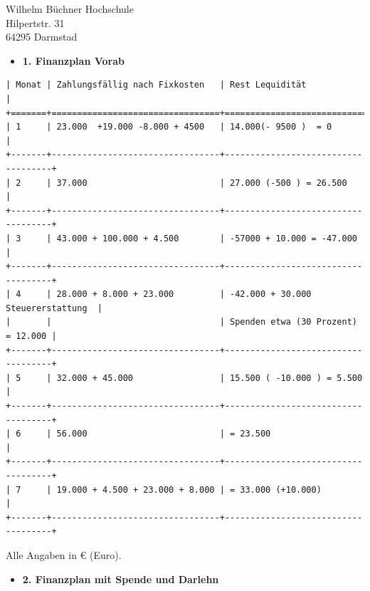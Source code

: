 \documentclass[
    version=last,           %
    DIV=13,                 %
    BCOR=0mm,               %
    paper=a4,               %
    fontsize=12pt,          %
    firsthead=on,           %
    firstfoot=on,           %
    pagenumber=on,i         %
    parskip=half,           %
    enlargefirstpage=,      %
    firsthead=on,           %
    fromrule=afteraddress,  %
    priority=off,           %
    backaddress=true,       %
    refline=dateright,      %
	fromalign=right,	    %
    fromemail=on,i          %
    fromurl=on,             %
    frombank=on,
    fromphone=on,           %
    frommobilephone=on      %
    fromlogo=on,            %
    addrfield=on,           %
    subject=untitled,  %
    foldmarks=off,          %
    numericaldate=off,      %
	pagenumber=right,	        %
	parskip=half,	        %
    headsep=false,          %
    footsepline=true,       %
    foldmarks=off,		    %
	]{scrlttr2}
\begin{document}
\begin{letter} {Wilhelm Büchner Hochschule \\
Hilpertstr. 31\\
64295 Darmstad}
\begin{itemize}
\item  \textbf{1. Finanzplan Vorab}
\end{itemize}

        \begin{verbatim}
| Monat | Zahlungsfällig nach Fixkosten   | Rest Lequidität                    |
+=======+=================================+====================================+
| 1     | 23.000  +19.000 -8.000 + 4500   | 14.000(- 9500 )  = 0               |
+-------+---------------------------------+------------------------------------+
| 2     | 37.000                          | 27.000 (-500 ) = 26.500            |
+-------+---------------------------------+------------------------------------+
| 3     | 43.000 + 100.000 + 4.500        | -57000 + 10.000 = -47.000          |
+-------+---------------------------------+------------------------------------+
| 4     | 28.000 + 8.000 + 23.000         | -42.000 + 30.000 Steuererstattung  |
|       |                                 | Spenden etwa (30 Prozent) = 12.000 |
+-------+---------------------------------+------------------------------------+
| 5     | 32.000 + 45.000                 | 15.500 ( -10.000 ) = 5.500         |
+-------+---------------------------------+------------------------------------+
| 6     | 56.000                          | = 23.500                           |
+-------+---------------------------------+------------------------------------+
| 7     | 19.000 + 4.500 + 23.000 + 8.000 | = 33.000 (+10.000)                 |
+-------+---------------------------------+------------------------------------+
        \end{verbatim}

Alle Angaben in € (Euro).

\begin{itemize}
    \item \textbf{2. Finanzplan mit Spende und Darlehn}
\end{itemize}


\end{letter}
\end{document}
